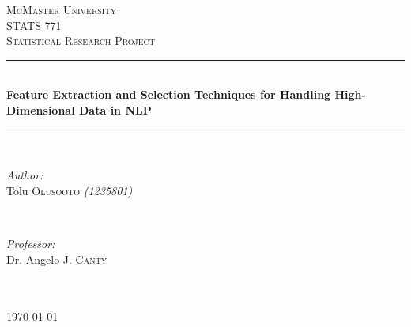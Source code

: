 \documentclass[12pt]{article}
\begin{document}
\begin{titlepage}

  \newcommand{\HRule}{\rule{\linewidth}{0.5mm}}
  \center

  \textsc{\LARGE McMaster University}\\[1.5cm]
  \textsc{\Large STATS 771}\\[0.5cm]
  \textsc{\large Statistical Research Project}\\[0.5cm]

  \HRule \\[0.4cm]
  { \huge \bfseries Feature Extraction and Selection Techniques for Handling High-Dimensional Data in NLP}\\[0.4cm]
  \HRule \\[1.5cm]

  \begin{minipage}{0.4\textwidth}
    \begin{flushleft} \large
      \emph{Author:}\\
      Tolu \textsc{Olusooto}
      \textit{(1235801)}\\
    \end{flushleft}
  \end{minipage}
  ~
  \begin{minipage}{0.4\textwidth}
    \begin{flushright} \large
      \emph{Professor:} \\
      Dr. Angelo J. \textsc{Canty}\\
      \textit{} \\
    \end{flushright}
  \end{minipage}\\[2cm]

  {\large \today}\\[2cm]


  \vfill
  \newpage


\end{titlepage}
\end{document}
